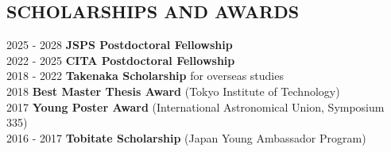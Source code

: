 \documentclass[]{res}
\begin{document}
\begin{resume}
\section{SCHOLARSHIPS AND AWARDS}
\noindent
\begin{tabbing}
    2025 - 2028 \hspace{2mm} \=\textbf{JSPS Postdoctoral Fellowship}\\
    2022 - 2025 \hspace{2mm} \=\textbf{CITA Postdoctoral Fellowship}\\
    2018 - 2022 \hspace{2mm} \=\textbf{Takenaka Scholarship} for overseas studies\\
    2018        \hspace{2mm} \>\textbf{Best Master Thesis Award} (Tokyo Institute of Technology)\\
    2017        \hspace{2mm} \>\textbf{Young Poster Award} (International Astronomical Union, Symposium 335)\\
    2016 - 2017 \hspace{2mm} \>\textbf{Tobitate Scholarship} (Japan Young Ambassador Program)
\end{tabbing}


\end{resume}
\end{document}
